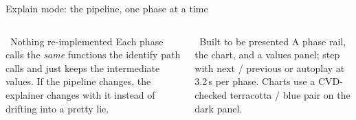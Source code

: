 \documentclass[aspectratio=169,11pt,t]{beamer}
\newcommand\phase[6]{%
  \node[ph=#2] (p#1) at (#1*2.35,0)
    {\rule{0pt}{10pt}\\{\Large\textcolor{#2}{#3}}\\[3pt]\textbf{#4}\\[2pt]#5\\{\tiny\color{muted}#6}};
  \node[phnum=#2] at (p#1.north) {\the\numexpr#1+1\relax};}
\begin{document}
\begin{frame}{Explain mode: the pipeline, one phase at a time}
\centering
{}

\vspace{2.5mm}
\begin{columns}[T,onlytextwidth]
\begin{card}[terra]{\faCheckDouble\ Nothing re-implemented}
\scriptsize Each phase calls the \emph{same} functions the identify path calls and just keeps the intermediate values. If the
pipeline changes, the explainer changes with it instead of drifting into a pretty lie.
\end{card}
\begin{card}[sky]{\faPlay\ Built to be presented}
\scriptsize A phase rail, the chart, and a values panel; step with next / previous or autoplay at 3.2\,s per phase.
Charts use a CVD-checked terracotta / blue pair on the dark panel.
\end{card}
\end{columns}
\end{frame}
\end{document}
